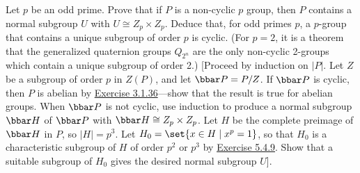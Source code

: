 \begin{exercise}\label{ex5.5.20}
    Let $p$ be an odd prime. Prove that if $P$ is a non-cyclic $p$ group, then $P$ contains a normal subgroup $U$ with $U \cong Z_p \times Z_p$. Deduce that, for odd primes $p$, a $p$-group that contains a unique subgroup of order $p$ is cyclic. (For $p = 2$, it is a theorem that the generalized quaternion groups $Q_{2^n}$ are the only non-cyclic 2-groups which contain a unique subgroup of order 2.) [Proceed by induction on $|P|$. Let $Z$ be a subgroup of order $p$ in $Z(P)$, and let $\bbar P = P/Z$. If $\bbar P$ is cyclic, then $P$ is abelian by \hyperref[ex3.1.36]{Exercise 3.1.36}---show that the result is true for abelian groups. When $\bbar P$ is not cyclic, use induction to produce a normal subgroup $\bbar H$ of $\bbar P$ with $\bbar H \cong Z_p \times Z_p$. Let $H$ be the complete preimage of $\bbar H$ in $P$, so $|H| = p^3$. Let $H_0 = \set{x \in H \mid x^p = 1}$, so that $H_0$ is a characteristic subgroup of $H$ of order $p^2$ or $p^3$ by \hyperref[ex5.4.9]{Exercise 5.4.9}. Show that a suitable subgroup of $H_0$ gives the desired normal subgroup $U$].
\end{exercise}

